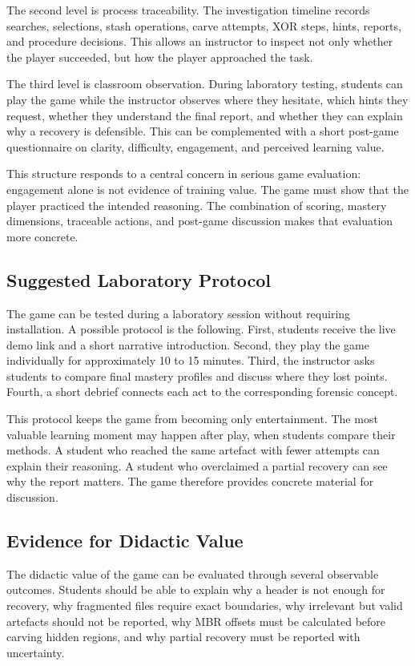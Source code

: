 \documentclass[11pt,a4paper]{article}
\begin{document}
The second level is process traceability. The investigation timeline records searches, selections, stash operations, carve attempts, XOR steps, hints, reports, and procedure decisions. This allows an instructor to inspect not only whether the player succeeded, but how the player approached the task.

The third level is classroom observation. During laboratory testing, students can play the game while the instructor observes where they hesitate, which hints they request, whether they understand the final report, and whether they can explain why a recovery is defensible. This can be complemented with a short post-game questionnaire on clarity, difficulty, engagement, and perceived learning value.

This structure responds to a central concern in serious game evaluation: engagement alone is not evidence of training value. The game must show that the player practiced the intended reasoning. The combination of scoring, mastery dimensions, traceable actions, and post-game discussion makes that evaluation more concrete.

\subsection{Suggested Laboratory Protocol}

The game can be tested during a laboratory session without requiring installation. A possible protocol is the following. First, students receive the live demo link and a short narrative introduction. Second, they play the game individually for approximately 10 to 15 minutes. Third, the instructor asks students to compare final mastery profiles and discuss where they lost points. Fourth, a short debrief connects each act to the corresponding forensic concept.

This protocol keeps the game from becoming only entertainment. The most valuable learning moment may happen after play, when students compare their methods. A student who reached the same artefact with fewer attempts can explain their reasoning. A student who overclaimed a partial recovery can see why the report matters. The game therefore provides concrete material for discussion.

\subsection{Evidence for Didactic Value}

The didactic value of the game can be evaluated through several observable outcomes. Students should be able to explain why a header is not enough for recovery, why fragmented files require exact boundaries, why irrelevant but valid artefacts should not be reported, why MBR offsets must be calculated before carving hidden regions, and why partial recovery must be reported with uncertainty.
\end{document}
